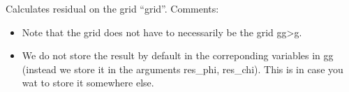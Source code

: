 \documentclass[letterpaper,10pt,english]{sphinxmanual}
\begin{document}
\begin{fulllineitems}
\label{\detokenize{sphinx-c-apidoc/output/gravity/mond_mass/gs_residual_truncation_error_mm_c:c.residual_mm}}%
\pysigstartmultiline
{}%
\pysigstopmultiline
Calculates residual on the grid “grid”.
Comments:
\begin{itemize}
\item {} 
Note that the grid does not have to necessarily be the grid gg\sphinxhyphen{}\textgreater{}g.

\item {} 
We do not store the result by default in the correponding variables in gg (instead we store it in
the arguments res\_phi, res\_chi).  This is in case you wat to store it somewhere else.

\end{itemize}

\end{fulllineitems}



\begin{fulllineitems}
\end{fulllineitems}



\begin{fulllineitems}
\end{fulllineitems}



\begin{fulllineitems}
\end{fulllineitems}

\end{document}
